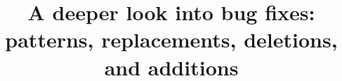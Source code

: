 \documentclass{sig-alternate-05-2015}
\begin{document}






%

\title{A deeper look into bug fixes: patterns, replacements, deletions, and additions}

%
%
%
%
%
\end{document}
